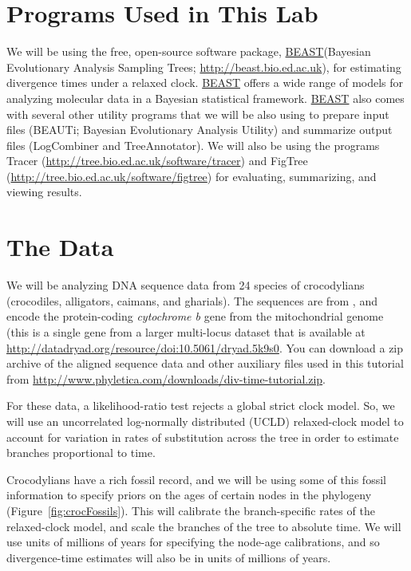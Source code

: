 \documentclass{article}
\newcommand{\program}[1]{#1\xspace}
\newcommand{\beast}{\href{http://beast.bio.ed.ac.uk/Main_Page}{\program{BEAST}}\xspace}
\begin{document}
\section{Programs Used in This Lab}
We will be using the free, open-source software package, \beast (Bayesian
Evolutionary Analysis Sampling Trees;
\href{http://beast.bio.ed.ac.uk}{\url{http://beast.bio.ed.ac.uk}}), for
estimating divergence times under a relaxed clock.
\beast offers a wide range of models for analyzing molecular data in
a Bayesian statistical framework.
\beast also comes with several other utility programs that we will be also
using to prepare input files (\program{BEAUTi}; Bayesian Evolutionary Analysis
Utility) and summarize output files (\program{LogCombiner and TreeAnnotator}).
We will also be using the programs \program{Tracer}
(\href{http://tree.bio.ed.ac.uk/software/tracer}{\url{http://tree.bio.ed.ac.uk/software/tracer}})
and \program{FigTree}
(\href{http://tree.bio.ed.ac.uk/software/figtree}{\url{http://tree.bio.ed.ac.uk/software/figtree}})
for evaluating, summarizing, and viewing results.

\section{The Data}
We will be analyzing DNA sequence data from 24 species of crocodylians
(crocodiles, alligators, caimans, and gharials).
The sequences are from \citet{Oaks2011}, and encode the protein-coding
\emph{cytochrome b} gene from the mitochondrial genome (this is a single gene
from a larger multi-locus dataset that is available at
\href{http://datadryad.org/resource/doi:10.5061/dryad.5k9s0}{\url{http://datadryad.org/resource/doi:10.5061/dryad.5k9s0}}.
You can download a zip archive of the aligned sequence data and other auxiliary
files used in this tutorial from
\href{http://www.phyletica.com/downloads/div-time-tutorial.zip}{\url{http://www.phyletica.com/downloads/div-time-tutorial.zip}}.

For these data, a likelihood-ratio test rejects a global strict clock model.
So, we will use an uncorrelated log-normally distributed (UCLD) relaxed-clock
model \citep{Drummond2006} to account for variation in rates of substitution
across the tree in order to estimate branches proportional to time.

Crocodylians have a rich fossil record, and we will be using some of this
fossil information to specify priors on the ages of certain nodes in the
phylogeny (Figure~\ref{fig:crocFossils}).
This will calibrate the branch-specific rates of the relaxed-clock model, and
scale the branches of the tree to absolute time.
We will use units of millions of years for specifying the node-age
calibrations, and so divergence-time estimates will also be in units of
millions of years.
\end{document}
